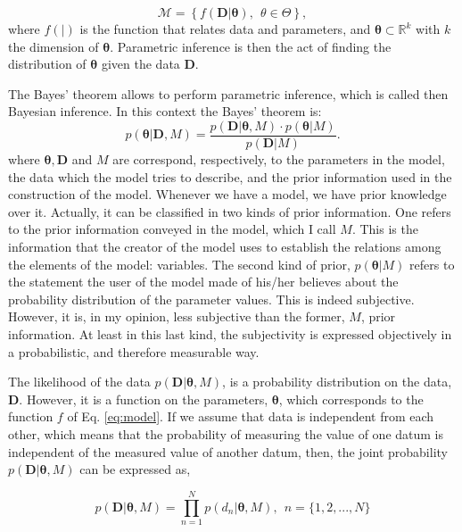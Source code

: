\begin{equation}
\label{eq:model}
\mathcal{M}=\left\{ f(\mathbf{D}| \mathbf{\theta}), \ \ \theta \in \Theta\right\},
\end{equation}
 where $f(|)$ is the function that relates data and parameters, and $\mathbf{\theta} \subset \mathbb{R}^k$  with $k$ the dimension of $\mathbf{\theta}$.
Parametric inference is then the act of finding the distribution of $\mathbf{\theta}$ given the data $\mathbf{D}$.
 
The Bayes' theorem allows to perform parametric inference, which is called then Bayesian inference. In this context the Bayes'  theorem is:
\begin{equation}
p(\mathbf{\theta}|\mathbf{D},M) = \frac{p(\mathbf{D}|\mathbf{\theta},M)\cdot p(\mathbf{\theta}|M)}{p(\mathbf{D}|M)}.
\end{equation}
where $\mathbf{\theta},\mathbf{D}$ and $M$ are correspond, respectively, to the parameters in the model, the data which the model tries to describe, and the prior information used in the construction of the model. 
Whenever we have a model, we have prior knowledge over it. Actually, it can be classified in two kinds of prior information. One refers to the prior information conveyed in the model, which I call $M$. This is the information that the creator of the model uses to establish the relations among the elements of the model: variables. The second kind of prior, $p(\mathbf{\theta}|M)$ refers to the statement the user of the model made of his/her believes about the probability distribution of the parameter values. This is indeed subjective. However, it is, in my opinion, less subjective than the former, $M$, prior information. At least in this last kind, the subjectivity is expressed objectively in a probabilistic, and therefore measurable way.

The likelihood of the data $p(\mathbf{D}|\mathbf{\theta},M)$, is a probability distribution on the data, $\mathbf{D}$. However, it is a function on the parameters, $\mathbf{\theta}$, which corresponds to the function $f$ of Eq. \ref{eq:model}. If we assume that data is independent from each other, which means that the probability of measuring the value of one datum is independent of the measured value of another datum, then, the joint probability  $p(\mathbf{D}|\mathbf{\theta},M)$ can be expressed as,

\begin{equation}
 p(\mathbf{D}|\mathbf{\theta},M) = \prod_{n=1}^N p(d_n|\mathbf{\theta},M), \ \ n=\{1,2,...,N\}
\end{equation}

